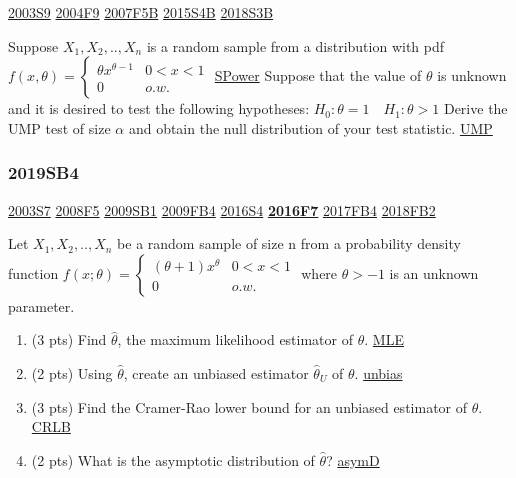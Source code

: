 \documentclass[10pt,twocolumn,portrait]{article}
\begin{document}
\protect\hyperlink{s9}{2003S9} \protect\hyperlink{f9-2}{2004F9}
\protect\hyperlink{f5b}{2007F5B} \protect\hyperlink{s4b-1}{2015S4B}
\protect\hyperlink{s3b-2}{2018S3B}

Suppose \(X_1,X_2,..,X_n\) is a random sample from a distribution with
pdf
\(f(x,\theta)=\begin{cases}\theta x^{\theta-1}& 0<x<1\\0& o.w.\end{cases}\)
\protect\hyperlink{SPower}{SPower} Suppose that the value of \(\theta\)
is unknown and it is desired to test the following hypotheses:
\(H_0:\theta=1\quad H_1 :\theta>1\) Derive the UMP test of size
\(\alpha\) and obtain the null distribution of your test statistic.
\protect\hyperlink{section-7}{UMP}

\hypertarget{sb4-2}{%
\subsubsection{2019SB4}\label{sb4-2}}

\protect\hyperlink{s7}{2003S7} \protect\hyperlink{f5-3}{2008F5}
\protect\hyperlink{sb1}{2009SB1} \protect\hyperlink{fb4}{2009FB4}
\protect\hyperlink{s4-4}{2016S4}
\textbf{\protect\hyperlink{f7-5}{2016F7}}
\protect\hyperlink{fb4-3}{2017FB4} \protect\hyperlink{fb2-4}{2018FB2}

Let \(X_1,X_2,..,X_n\) be a random sample of size n from a probability
density function
\(f(x;\theta)=\begin{cases}(\theta+1)x^\theta& 0<x<1\\0& o.w.\end{cases}\)
where \(\theta>-1\) is an unknown parameter.

\begin{enumerate}
\def\labelenumi{(\alph{enumi})}
\item
  (3 pts) Find \(\hat\theta\), the maximum likelihood estimator of
  \(\theta\). \protect\hyperlink{MLE}{MLE}
\item
  (2 pts) Using \(\hat\theta\), create an unbiased estimator
  \(\hat\theta_U\) of \(\theta\). \protect\hyperlink{section-4}{unbias}
\item
  (3 pts) Find the Cramer-Rao lower bound for an unbiased estimator of
  \(\theta\). \protect\hyperlink{section-5}{CRLB}
\item
  (2 pts) What is the asymptotic distribution of \(\hat\theta\)?
  \protect\hyperlink{asymD}{asymD}
\end{enumerate}
\end{document}
